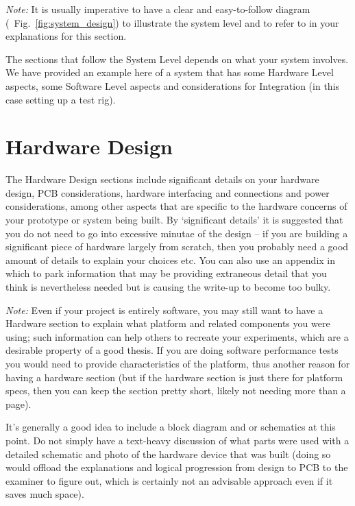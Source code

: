 \emph{Note:} It is usually imperative to have a clear and easy-to-follow diagram (\eg~Fig.~\ref{fig:system_design}) to illustrate the system level and to refer to in your explanations for this section.


The sections that follow the System Level depends on what your system involves. We have provided an example here of a system that has some Hardware Level aspects, some Software Level aspects and considerations for Integration (in this case setting up a test rig).

\section{Hardware Design}
\label{sec:Design/HardwareDesign}

The Hardware Design sections include significant details on your hardware design, PCB considerations, hardware interfacing and connections and power considerations, among other aspects that are specific to the hardware concerns of your prototype or system being built.  By `significant details' it is suggested that you do not need to go into excessive minutae of the design -- if you are building a significant piece of hardware largely from scratch, then you probably need a good amount of details to explain your choices etc.  You can also use an appendix in which to park information that may be providing extraneous detail that you think is nevertheless needed but is causing the write-up to become too bulky.

\emph{Note:} Even if your project is entirely software, you may still want to have a Hardware section to explain what platform and related components you were using; such information can help others to recreate your experiments, which are a desirable property of a good thesis.  If you are doing software performance tests you would need to provide characteristics of the platform, thus another reason for having a hardware section (but if the hardware section is just there for platform specs, then you can keep the section pretty short, likely not needing more than a page).

It's generally a good idea to include a block diagram and or schematics at this point.  Do not simply have a text-heavy discussion of what parts were used with a detailed schematic and photo of the hardware device that was built (doing so would offload the explanations and logical progression from design to PCB to the examiner to figure out, which is certainly not an advisable approach even if it saves much space).

